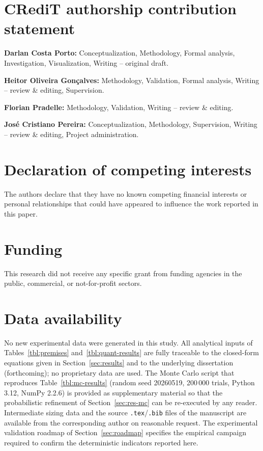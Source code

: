 \documentclass[preprint,12pt,a4paper]{elsarticle}
\let\oldsection\section
\renewcommand\section{\FloatBarrier\oldsection}
\begin{document}

\section*{CRediT authorship contribution statement}

\noindent\textbf{Darlan Costa Porto:} Conceptualization, Methodology, Formal analysis, Investigation, Visualization, Writing -- original draft.

\noindent\textbf{Heitor Oliveira Gon\c{c}alves:} Methodology, Validation, Formal analysis, Writing -- review \& editing, Supervision.

\noindent\textbf{Florian Pradelle:} Methodology, Validation, Writing -- review \& editing.

\noindent\textbf{Jos\'e Cristiano Pereira:} Conceptualization, Methodology, Supervision, Writing -- review \& editing, Project administration.


\section*{Declaration of competing interests}
The authors declare that they have no known competing financial interests
or personal relationships that could have appeared to influence the work
reported in this paper.

\section*{Funding}
This research did not receive any specific grant from funding agencies in
the public, commercial, or not-for-profit sectors.

\section*{Data availability}
No new experimental data were generated in this study. All analytical
inputs of Tables~\ref{tbl:premises} and~\ref{tbl:quant-results} are
fully traceable to the closed-form equations given in
Section~\ref{sec:results} and to the underlying
dissertation~\cite{porto2026dissertation} (forthcoming); no proprietary
data are used. The Monte Carlo script that reproduces
Table~\ref{tbl:mc-results} (random seed 20260519, 200\,000 trials,
Python 3.12, NumPy 2.2.6) is provided as supplementary material so that
the probabilistic refinement of Section~\ref{sec:res-mc} can be
re-executed by any reader. Intermediate sizing data and the source
\texttt{.tex}/\texttt{.bib} files of the manuscript are available from
the corresponding author on reasonable request. The experimental
validation roadmap of Section~\ref{sec:roadmap} specifies the empirical
campaign required to confirm the deterministic indicators reported
here.
\end{document}
